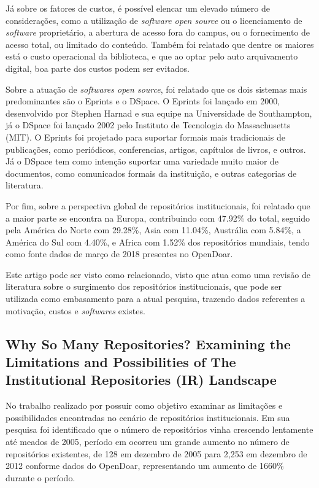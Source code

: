 Já sobre os fatores de custos, é possível elencar um elevado número de considerações,
como a utilização de \emph{software open source} ou o licenciamento de \emph{software}
proprietário, a abertura de acesso fora do campus, ou o fornecimento de acesso total, ou
limitado do conteúdo. Também foi relatado que dentre os maiores está o custo operacional
da biblioteca, e que ao optar pelo auto arquivamento digital, boa parte dos custos
podem ser evitados.

Sobre a atuação de \emph{softwares open source}, foi relatado que os dois sistemas mais
predominantes são o Eprints e o DSpace. O Eprints foi lançado em 2000, desenvolvido por
Stephen Harnad e sua equipe na Universidade de Southampton, já o DSpace foi lançado 2002
pelo Instituto de Tecnologia do Massachusetts (MIT). O Eprints foi projetado para suportar
formais mais tradicionais de publicações, como periódicos, conferencias, artigos, capítulos
de livros, e outros. Já o DSpace tem como intenção suportar uma variedade muito maior de
documentos, como comunicados formais da instituição, e outras categorias de literatura.

Por fim, sobre a perspectiva global de repositórios institucionais, foi relatado que
a maior parte se encontra na Europa, contribuindo com 47.92\% do total,
seguido pela América do Norte com 29.28\%, Asia com 11.04\%, Austrália com 5.84\%,
a América do Sul com 4.40\%, e Africa com 1.52\% dos repositórios mundiais, tendo como fonte
dados de março de 2018 presentes no OpenDoar.

Este artigo pode ser visto como relacionado, visto que atua como uma revisão de literatura
sobre o surgimento dos repositórios institucionais, que pode ser utilizada como embasamento
para a atual pesquisa, trazendo dados referentes a motivação, custos e \emph{softwares} existes.

\subsection{Why So Many Repositories? Examining the Limitations and Possibilities of The Institutional Repositories (IR) Landscape}

No trabalho realizado por \cite{Arlitsch:2018} possuir como objetivo examinar as limitações
e possibilidades encontradas no cenário de repositórios institucionais. Em sua pesquisa
foi identificado que o número de repositórios vinha crescendo lentamente até meados de 2005,
período em ocorreu um grande aumento no número de repositórios existentes, de 128 em dezembro
de 2005 para 2,253 em dezembro de 2012 conforme dados do OpenDoar, representando um aumento
de 1660\% durante o período.

